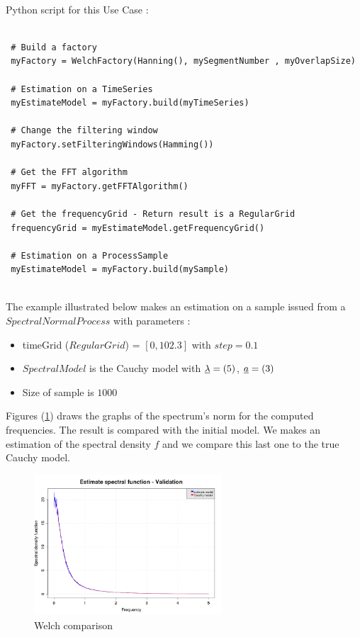 \textspace\\
Python script for this Use Case :

\begin{lstlisting}

 # Build a factory 
 myFactory = WelchFactory(Hanning(), mySegmentNumber , myOverlapSize)

 # Estimation on a TimeSeries
 myEstimateModel = myFactory.build(myTimeSeries)

 # Change the filtering window 
 myFactory.setFilteringWindows(Hamming())

 # Get the FFT algorithm
 myFFT = myFactory.getFFTAlgorithm()

 # Get the frequencyGrid - Return result is a RegularGrid
 frequencyGrid = myEstimateModel.getFrequencyGrid()
    
 # Estimation on a ProcessSample
 myEstimateModel = myFactory.build(mySample)

\end{lstlisting}

\textspace\\
The example illustrated below makes an estimation on a sample issued from a $SpectralNormalProcess$ with parameters :
\begin{itemize}
 \item  timeGrid ($RegularGrid$) = $[0, 102.3]$ with $step=0. 1$
 \item  $SpectralModel$ is the Cauchy model with ${\underline{\lambda}}=(5)$, ${\underline{a}}=(3)$ 
 \item Size of sample is $1000$
\end{itemize}

Figures (\ref{welch_validation}) draws the graphs of the spectrum's norm for the computed frequencies. 
The result is compared with the initial model.
We makes an estimation of the spectral density $f$ and we compare this last one to the true Cauchy model. 


\begin{figure}[H]
\begin{center}
  \includegraphics[width=7cm]{welchValidation.png}
  \caption{Welch comparison }
  \label{welch_validation}
\end{center}
\end{figure}



